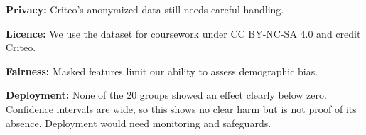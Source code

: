 \textbf{Privacy:} Criteo's anonymized data still needs careful handling.

\textbf{Licence:} We use the dataset for coursework under CC BY-NC-SA 4.0 and credit Criteo.

\textbf{Fairness:} Masked features limit our ability to assess demographic bias.

\textbf{Deployment:} None of the 20 groups showed an effect clearly below zero. Confidence intervals are wide, so this shows no clear harm but is not proof of its absence. Deployment would need monitoring and safeguards.
